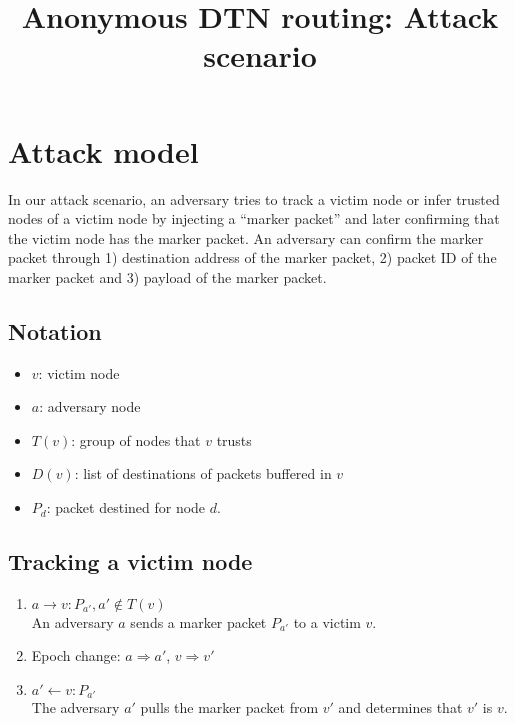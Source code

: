 \documentclass[11pt]{article}
\begin{document}
\title{Anonymous DTN routing: Attack scenario}
\maketitle




\section{Attack model}
In our attack scenario, an adversary tries to track a victim node or infer trusted nodes of a victim node by injecting a ``marker packet'' and later confirming that the victim node has the marker packet.  
An adversary can confirm the marker packet through 1) destination address of the marker packet, 2) packet ID of the marker packet and 3) payload of the marker packet.


\subsection{Notation}
\begin{itemize}
\item $v$: victim node
\item $a$: adversary node
\item $T(v)$: group of nodes that $v$ trusts
\item $D(v)$: list of destinations of packets buffered in $v$
\item $P_{d}$: packet destined for node $d$.
\end{itemize}



\subsection{Tracking a victim node}
\begin{enumerate}
\item $a \rightarrow v: P_{a'}, a' \notin T(v)$	\\
An adversary $a$ sends a marker packet $P_{a'}$ to a victim $v$.

\item Epoch change: $a \Rightarrow a'$, $v \Rightarrow v'$ 

\item $a' \leftarrow v: P_{a'}$	\\
The adversary $a'$ pulls the marker packet from $v'$ and determines that $v'$ is $v$.
\end{enumerate}
\end{document}
